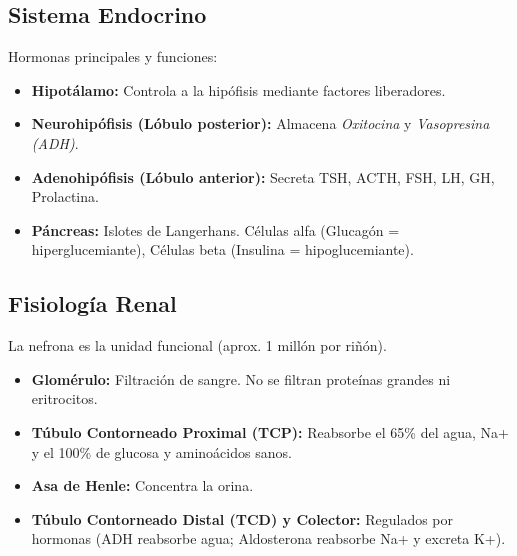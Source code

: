\documentclass[spanish,letterpaper,oneside]{article}
\begin{document}
\subsection{Sistema Endocrino}
Hormonas principales y funciones:
\begin{itemize}
    \item \textbf{Hipotálamo:} Controla a la hipófisis mediante factores liberadores.
    \item \textbf{Neurohipófisis (Lóbulo posterior):} Almacena \textit{Oxitocina} y \textit{Vasopresina (ADH)}.
    \item \textbf{Adenohipófisis (Lóbulo anterior):} Secreta TSH, ACTH, FSH, LH, GH, Prolactina.
    \item \textbf{Páncreas:} Islotes de Langerhans. Células alfa (Glucagón = hiperglucemiante), Células beta (Insulina = hipoglucemiante).
\end{itemize}

\subsection{Fisiología Renal}
La nefrona es la unidad funcional (aprox. 1 millón por riñón).
\begin{itemize}
    \item \textbf{Glomérulo:} Filtración de sangre. No se filtran proteínas grandes ni eritrocitos.
    \item \textbf{Túbulo Contorneado Proximal (TCP):} Reabsorbe el 65\% del agua, Na+ y el 100\% de glucosa y aminoácidos sanos.
    \item \textbf{Asa de Henle:} Concentra la orina.
    \item \textbf{Túbulo Contorneado Distal (TCD) y Colector:} Regulados por hormonas (ADH reabsorbe agua; Aldosterona reabsorbe Na+ y excreta K+).
\end{itemize}

\newpage
\end{document}
